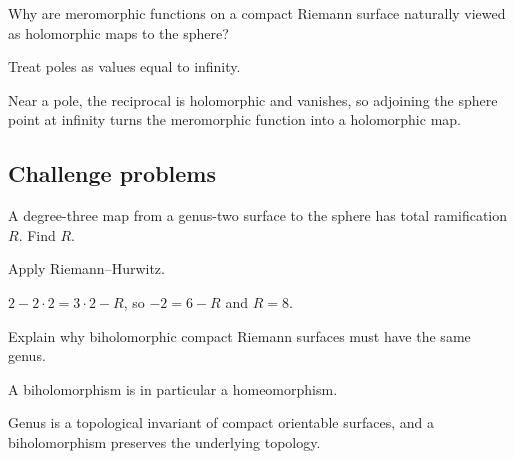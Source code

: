 \begin{exercise}\label{exr:iv26-expand-14}
Why are meromorphic functions on a compact Riemann surface naturally viewed as holomorphic maps to the sphere?
\end{exercise}
\begin{hint}
Treat poles as values equal to infinity.
\end{hint}
\begin{solution}
Near a pole, the reciprocal is holomorphic and vanishes, so adjoining the sphere point at infinity turns the meromorphic function into a holomorphic map.
\end{solution}

\subsection*{Challenge problems}

\begin{exercise}\label{exr:iv26-expand-15}
A degree-three map from a genus-two surface to the sphere has total ramification \(R\). Find \(R\).
\end{exercise}
\begin{hint}
Apply Riemann--Hurwitz.
\end{hint}
\begin{solution}
\(2-2\cdot2=3\cdot2-R\), so \(-2=6-R\) and \(R=8\).
\end{solution}

\begin{exercise}\label{exr:iv26-expand-16}
Explain why biholomorphic compact Riemann surfaces must have the same genus.
\end{exercise}
\begin{hint}
A biholomorphism is in particular a homeomorphism.
\end{hint}
\begin{solution}
Genus is a topological invariant of compact orientable surfaces, and a biholomorphism preserves the underlying topology.
\end{solution}

